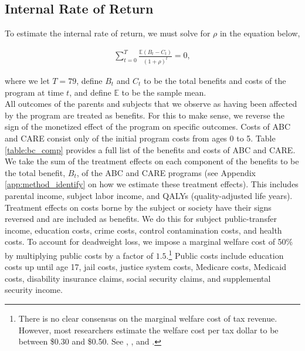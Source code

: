 \subsection{Internal Rate of Return}
\label{app:method_irr}

\noindent To estimate the internal rate of return, we must solve for $\rho$ in the equation below,

\begin{align}
\sum_{t=0}^T \frac{ \mathbb{E} (B_t - C_t)}{(1+\rho)^t} = 0,
\end{align}

\noindent where we let $T = 79$, define $B_t$ and $C_t$ to be the total benefits and costs of the
program at time $t$, and define $\mathbb{E}$ to be the sample mean. \\

\noindent All outcomes of the parents and subjects that we observe as having been affected by the program
are treated as benefits. For this to make sense, we reverse the sign of the monetized effect of the program
on specific outcomes. Costs of ABC and CARE consist only of the initial program costs from ages 0 to 5.
Table \ref{table:bc_comp} provides a full list of the benefits and costs of ABC and CARE. \\

\noindent We take the sum of the treatment effects on each component of the benefits to
be the total benefit, $B_t$, of the ABC and CARE programs (see Appendix \ref{app:method_identify} on how
we estimate these treatment effects). This includes parental income, subject labor income, and QALYs
(quality-adjusted life years).
Treatment effects on costs borne by the subject or society have their signs
reversed and are included as benefits. We do this for subject public-transfer income,
education costs, crime costs,
control contamination costs, and health costs. To account for deadweight loss, we
impose a marginal welfare cost of 50\% by multiplying public costs by a factor of
$1.5$.\footnote{There is no clear consensus on the marginal welfare cost of tax revenue. However,
most researchers estimate the welfare cost per tax dollar to be between \$0.30 and \$0.50. See
\citet{Feldstein_1999_REStat}, \citet{Heckman_Smith_1998_evaluating}, and \citet{Browning_1987_AER}.} Public costs include education costs up until age 17, jail costs, justice system costs, Medicare costs,
Medicaid costs, disability insurance claims, social security claims, and supplemental security
income. \\

